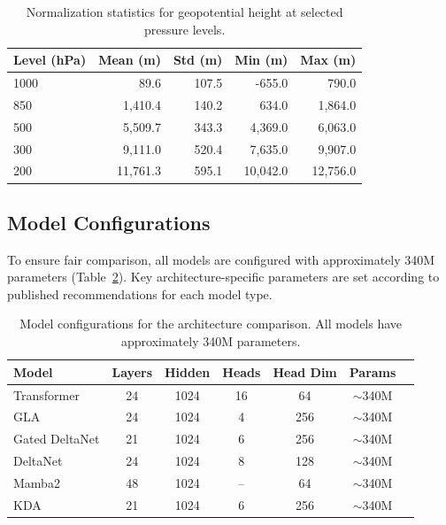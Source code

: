 \documentclass[runningheads]{llncs}
\begin{document}
\begin{table}[t]
    \centering
    \caption{Normalization statistics for geopotential height at selected pressure levels.}
    \label{tab:data_stats}
    \begin{tabular}{lrrrr}
        \toprule
        \textbf{Level (hPa)} & \textbf{Mean (m)} & \textbf{Std (m)} & \textbf{Min (m)} & \textbf{Max (m)} \\
        \midrule
        1000 & 89.6 & 107.5 & -655.0 & 790.0 \\
        850 & 1,410.4 & 140.2 & 634.0 & 1,864.0 \\
        500 & 5,509.7 & 343.3 & 4,369.0 & 6,063.0 \\
        300 & 9,111.0 & 520.4 & 7,635.0 & 9,907.0 \\
        200 & 11,761.3 & 595.1 & 10,042.0 & 12,756.0 \\
        \bottomrule
    \end{tabular}
\end{table}

\subsection{Model Configurations}

To ensure fair comparison, all models are configured with approximately 340M parameters (Table~\ref{tab:model_configs}). Key architecture-specific parameters are set according to published recommendations for each model type.

\begin{table}[t]
    \centering
    \caption{Model configurations for the architecture comparison. All models have approximately 340M parameters.}
    \label{tab:model_configs}
    \begin{tabular}{lcccccc}
        \toprule
        \textbf{Model} & \textbf{Layers} & \textbf{Hidden} & \textbf{Heads} & \textbf{Head Dim} & \textbf{Params} \\
        \midrule
        Transformer & 24 & 1024 & 16 & 64 & $\sim$340M \\
        GLA & 24 & 1024 & 4 & 256 & $\sim$340M \\
        Gated DeltaNet & 21 & 1024 & 6 & 256 & $\sim$340M \\
        DeltaNet & 24 & 1024 & 8 & 128 & $\sim$340M \\
        Mamba2 & 48 & 1024 & -- & 64 & $\sim$340M \\
        KDA & 21 & 1024 & 6 & 256 & $\sim$340M \\
        \bottomrule
    \end{tabular}
\end{table}
\end{document}
